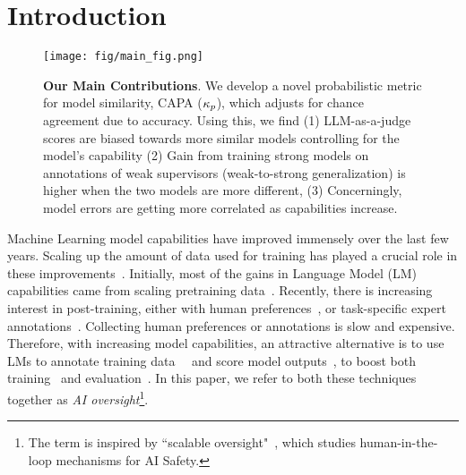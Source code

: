 \section{Introduction}

\begin{figure}[t]
    \centering
    \texttt{[image: fig/main\_fig.png]}
    \caption{\textbf{Our Main Contributions}. We develop a novel probabilistic metric for model similarity, CAPA ($\kappa_{p}$), which adjusts for chance agreement due to accuracy. Using this, we find (1) LLM-as-a-judge scores are biased towards more similar models controlling for the model's capability (2) Gain from training strong models on annotations of weak supervisors (weak-to-strong generalization) is higher when the two models are more different, (3) Concerningly, model errors are getting more correlated as capabilities increase.}
    \label{fig:main-fig}
    \vspace{-.2cm} %
\end{figure}

Machine Learning model capabilities have improved immensely over the last few years. Scaling up the amount of data used for training has played a crucial role in these improvements~\citep{kaplan2020scaling}. Initially, most of the gains in Language Model (LM) capabilities came from scaling pretraining data~\citep{grattafiori2024llama3herdmodels}. Recently, there is increasing interest in post-training, either with human preferences~\citep{ouyang2022traininglanguagemodelsfollow}, or task-specific expert annotations~\citep{lightman2023let}. Collecting human preferences or annotations is slow and expensive. Therefore, with increasing model capabilities, an attractive alternative is to use LMs to annotate training data~~\citep{gilardi2023chatgpt} and score model outputs~\citep{zheng2023judging}, to boost both training~\citep{stiennon2020learning} and evaluation~\citep{li2024crowdsourceddatahighqualitybenchmarks}. In this paper, we refer to both these techniques together as \textit{AI oversight}\footnote{The term is inspired by ``scalable oversight"~\citep{bowman2022measuringprogress}, which studies human-in-the-loop mechanisms for AI Safety.}. 

